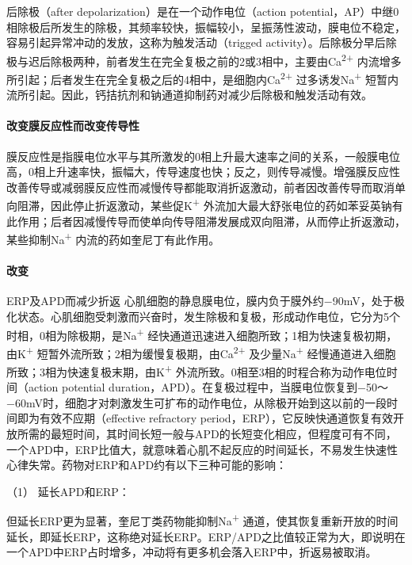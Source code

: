 后除极（after depolarization）是在一个动作电位（action
potential，AP）中继0相除极后所发生的除极，其频率较快，振幅较小，呈振荡性波动，膜电位不稳定，容易引起异常冲动的发放，这称为触发活动（trigged
activity）。后除极分早后除极与迟后除极两种，前者发生在完全复极之前的2或3相中，主要由Ca\textsuperscript{2+}
内流增多所引起；后者发生在完全复极之后的4相中，是细胞内Ca\textsuperscript{2+}
过多诱发Na\textsuperscript{+}
短暂内流所引起。因此，钙拮抗剂和钠通道抑制药对减少后除极和触发活动有效。

\paragraph{改变膜反应性而改变传导性}

膜反应性是指膜电位水平与其所激发的0相上升最大速率之间的关系，一般膜电位高，0相上升速率快，振幅大，传导速度也快；反之，则传导减慢。增强膜反应性改善传导或减弱膜反应性而减慢传导都能取消折返激动，前者因改善传导而取消单向阻滞，因此停止折返激动，某些促K\textsuperscript{+}
外流加大最大舒张电位的药如苯妥英钠有此作用；后者因减慢传导而使单向传导阻滞发展成双向阻滞，从而停止折返激动，某些抑制Na\textsuperscript{+}
内流的药如奎尼丁有此作用。

\paragraph{改变}

ERP及APD而减少折返
心肌细胞的静息膜电位，膜内负于膜外约−90mV，处于极化状态。心肌细胞受刺激而兴奋时，发生除极和复极，形成动作电位，它分为5个时相，0相为除极期，是Na\textsuperscript{+}
经快通道迅速进入细胞所致；1相为快速复极初期，由K\textsuperscript{+}
短暂外流所致；2相为缓慢复极期，由Ca\textsuperscript{2+}
及少量Na\textsuperscript{+}
经慢通道进入细胞所致；3相为快速复极末期，由K\textsuperscript{+}
外流所致。0相至3相的时程合称为动作电位时间（action potential
duration，APD）。在复极过程中，当膜电位恢复到−50～−60mV时，细胞才对刺激发生可扩布的动作电位，从除极开始到这以前的一段时间即为有效不应期（effective
refractory
period，ERP），它反映快通道恢复有效开放所需的最短时间，其时间长短一般与APD的长短变化相应，但程度可有不同，一个APD中，ERP比值大，就意味着心肌不起反应的时间延长，不易发生快速性心律失常。药物对ERP和APD约有以下三种可能的影响：

\hypertarget{text00419.htmlux5cux23CHP17-4-1-4-1}{}
（1） 延长APD和ERP：

但延长ERP更为显著，奎尼丁类药物能抑制Na\textsuperscript{+}
通道，使其恢复重新开放的时间延长，即延长ERP，这称绝对延长ERP。ERP/APD之比值较正常为大，即说明在一个APD中ERP占时增多，冲动将有更多机会落入ERP中，折返易被取消。

